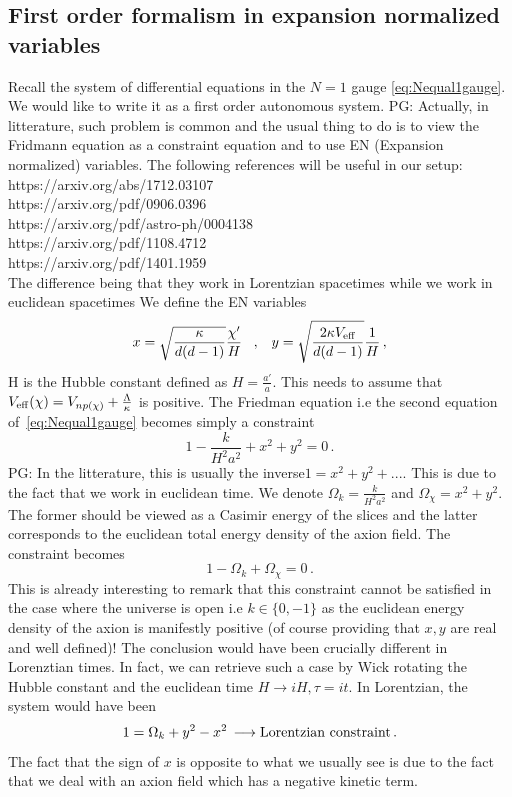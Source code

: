 \documentclass[a4paper]{article}
\def\sp{\;\;\;,\;\;\;}
\newcommand{\purple}[1]{{\color{purple} #1 \color{black}}}
\newcommand{\PG}[1]{{\purple{PG: #1}}} %
\begin{document}
\subsection{First order formalism in expansion normalized variables}
Recall the system of differential equations in the $N=1$ gauge \eqref{eq:Nequal1gauge}. We would like to write it as a first order autonomous system.\PG{Actually, in litterature, such problem is common and the usual thing to do is to view the Fridmann equation as a constraint equation and to use EN (Expansion normalized) variables. The following references will be useful in our setup:\\
https://arxiv.org/abs/1712.03107\\
https://arxiv.org/pdf/0906.0396\\
https://arxiv.org/pdf/astro-ph/0004138\\
https://arxiv.org/pdf/1108.4712\\
https://arxiv.org/pdf/1401.1959\\
The difference being that they work in Lorentzian spacetimes while we work in euclidean spacetimes
}
We define the EN variables
\begin{equation}
   x = \sqrt{\frac{\kappa}{d(d-1)}}\frac{\chi'}{H}\sp y = \sqrt{\frac{2\kappa V_{\rm{eff}}}{d(d-1)}}\frac{1}{H}\,,
\end{equation}
H is the Hubble constant defined as $H =\frac{a'}{a}$. This needs to assume that $V_{\rm{eff}}(\chi) = V_{np(\chi)}+\frac{\Lambda}{\kappa}$ is positive. The Friedman equation i.e the second equation of~\eqref{eq:Nequal1gauge} becomes simply a constraint
\begin{equation}
  1-\frac{k}{H^2 a^2}+x^2+y^2=0\,.
\end{equation}
\PG{In the litterature, this is usually the inverse$1 = x^2+y^2+...$. This is due to the fact that we work in euclidean time.} We denote $\Omega_k=\frac{k}{H^2 a^2}$ and $\Omega_{\chi}=x^2+y^2$. The former should be viewed as a Casimir energy of the slices and the latter corresponds to the euclidean total energy density of the axion field. The constraint becomes
\begin{equation}\label{eq:euclideanenergydensity}
  1 -\Omega_k + \Omega_\chi =0\,.
\end{equation}
This is already interesting to remark that this constraint cannot be satisfied in the case where the universe is open i.e $k\in\{0,-1\}$ as the euclidean energy density of the axion is manifestly positive (of course providing that $x,y$ are real and well defined)! The conclusion would have been crucially different in Lorenztian times. In fact, we can retrieve such a case by Wick rotating the Hubble constant and the euclidean time $H\rightarrow i H, \tau = i t$. In Lorentzian, the system would have been
\begin{equation}
  1 = \Omega_k +y^2 -x^2\, \longrightarrow \text{Lorentzian constraint\,.}
\end{equation}
The fact that the sign of $x$ is opposite to what we usually see is due to the fact that we deal with an axion field which has a negative kinetic term.
\end{document}
